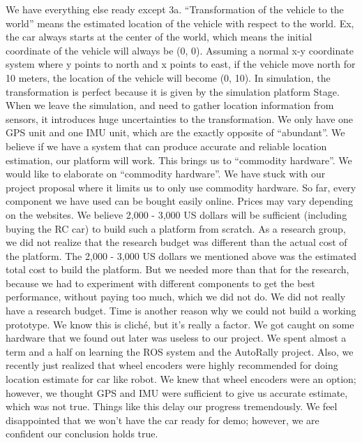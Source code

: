 \documentclass[compsoc,draftclsnofoot,onecolumn,10pt]{IEEEtran}
\begin{document}
We have everything else ready except 3a. “Transformation of the vehicle to the world” means the estimated location of the vehicle with respect to the world. Ex, the car always starts at the center of the world, which means the initial coordinate of the vehicle will always be (0, 0). Assuming a normal x-y coordinate system where y points to north and x points to east, if the vehicle move north for 10 meters, the location of the vehicle will become (0, 10). In simulation, the transformation is perfect because it is given by the simulation platform Stage. When we leave the simulation, and need to gather location information from sensors, it introduces huge uncertainties to the transformation. We only have one GPS unit and one IMU unit, which are the exactly opposite of “abundant”. We believe if we have a system that can produce accurate and reliable location estimation, our platform will work. This brings us to “commodity hardware”.
We would like to elaborate on “commodity hardware”. We have stuck with our project proposal where it limits us to only use commodity hardware. So far, every component we have used can be bought easily online. Prices may vary depending on the websites. We believe 2,000 - 3,000 US dollars will be sufficient (including buying the RC car) to build such a platform from scratch. 
As a research group, we did not realize that the research budget was different than the actual cost of the platform. The 2,000 - 3,000 US dollars we mentioned above was the estimated total cost to build the platform. But we needed more than that for the research, because we had to experiment with different components to get the best performance, without paying too much, which we did not do. We did not really have a research budget. 
Time is another reason why we could not build a working prototype. We know this is cliché, but it’s really a factor. We got caught on some hardware that we found out later was useless to our project. We spent almost a term and a half on learning the ROS system and the AutoRally project. Also, we recently just realized that wheel encoders were highly recommended for doing location estimate for car like robot. We knew that wheel encoders were an option; however,  we thought GPS and IMU were sufficient to give us accurate estimate, which was not true. Things like this delay our progress tremendously. We feel disappointed that we won’t have the car ready for demo; however,  we are confident our conclusion holds true. 
\end{document}
